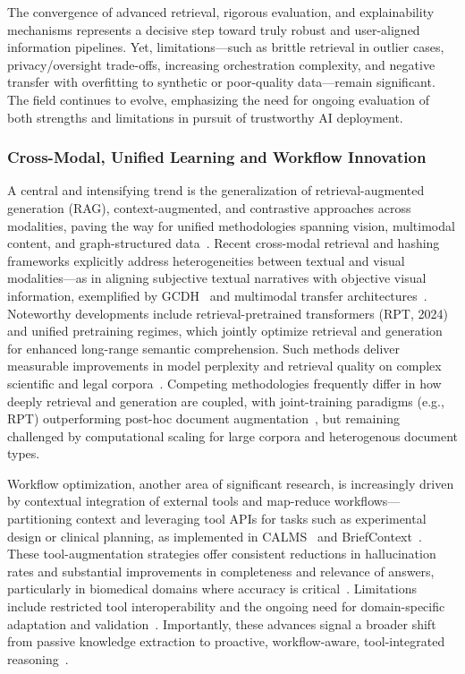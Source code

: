 \documentclass[sigconf]{acmart}
\begin{document}
The convergence of advanced retrieval, rigorous evaluation, and explainability mechanisms represents a decisive step toward truly robust and user-aligned information pipelines. Yet, limitations—such as brittle retrieval in outlier cases, privacy/oversight trade-offs, increasing orchestration complexity, and negative transfer with overfitting to synthetic or poor-quality data—remain significant. The field continues to evolve, emphasizing the need for ongoing evaluation of both strengths and limitations in pursuit of trustworthy AI deployment.

\subsubsection{Cross-Modal, Unified Learning and Workflow Innovation}

A central and intensifying trend is the generalization of retrieval-augmented generation (RAG), context-augmented, and contrastive approaches across modalities, paving the way for unified methodologies spanning vision, multimodal content, and graph-structured data~\cite{ref14,ref15,ref20,ref21,ref29,ref30,ref36,ref38,ref54,ref61}. Recent cross-modal retrieval and hashing frameworks explicitly address heterogeneities between textual and visual modalities---as in aligning subjective textual narratives with objective visual information, exemplified by GCDH~\cite{ref20} and multimodal transfer architectures~\cite{ref38}. Noteworthy developments include retrieval-pretrained transformers (RPT, 2024)~\cite{ref14} and unified pretraining regimes, which jointly optimize retrieval and generation for enhanced long-range semantic comprehension. Such methods deliver measurable improvements in model perplexity and retrieval quality on complex scientific and legal corpora~\cite{ref29,ref31,ref54,ref61}. Competing methodologies frequently differ in how deeply retrieval and generation are coupled, with joint-training paradigms (e.g., RPT) outperforming post-hoc document augmentation~\cite{ref14,ref15}, but remaining challenged by computational scaling for large corpora and heterogenous document types.

Workflow optimization, another area of significant research, is increasingly driven by contextual integration of external tools and map-reduce workflows---partitioning context and leveraging tool APIs for tasks such as experimental design or clinical planning, as implemented in CALMS~\cite{ref30} and BriefContext~\cite{ref48}. These tool-augmentation strategies offer consistent reductions in hallucination rates and substantial improvements in completeness and relevance of answers, particularly in biomedical domains where accuracy is critical~\cite{ref5,ref48,ref54}. Limitations include restricted tool interoperability and the ongoing need for domain-specific adaptation and validation~\cite{ref48}. Importantly, these advances signal a broader shift from passive knowledge extraction to proactive, workflow-aware, tool-integrated reasoning~\cite{ref28,ref48}. 
\end{document}
